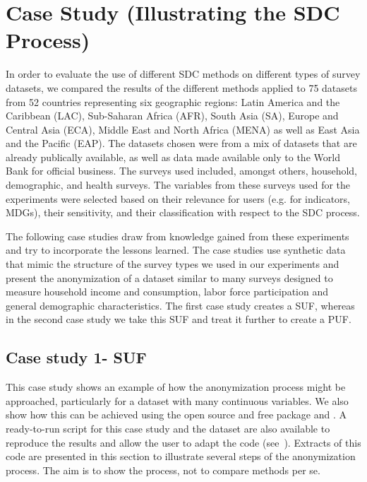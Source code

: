 \documentclass[letterpaper,10pt,english]{sphinxmanual}
\begin{document}
\chapter{Case Study (Illustrating the SDC Process)}
\label{\detokenize{case_studies:case-study-illustrating-the-sdc-process}}\label{\detokenize{case_studies::doc}}
In order to evaluate the use of different SDC methods on different types
of survey datasets, we compared the results of the different methods
applied to 75 datasets from 52 countries representing six geographic
regions: Latin America and the Caribbean (LAC), Sub-Saharan Africa
(AFR), South Asia (SA), Europe and Central Asia (ECA), Middle East and
North Africa (MENA) as well as East Asia and the Pacific (EAP). The
datasets chosen were from a mix of datasets that are already publically
available, as well as data made available only to the World Bank for
official business. The surveys used included, amongst others, household,
demographic, and health surveys. The variables from these surveys used
for the experiments were selected based on their relevance for users
(e.g. for indicators, MDGs), their sensitivity, and their classification
with respect to the SDC process.

The following case studies draw from knowledge gained from these
experiments and try to incorporate the lessons learned. The case studies
use synthetic data that mimic the structure of the survey types we used
in our experiments and present the anonymization of a dataset similar to
many surveys designed to measure household income and consumption, labor
force participation and general demographic characteristics. The first
case study creates a SUF, whereas in the second case study we take this
SUF and treat it further to create a PUF.


\section{Case study 1- SUF}
\label{\detokenize{case_studies:case-study-1-suf}}
This case study shows an example of how the anonymization process might
be approached, particularly for a dataset with many continuous
variables. We also show how this can be achieved using the open source
and free  package and . A ready-to-run  script for this
case study and the dataset are also available to reproduce the results
and allow the user to adapt the code
(see ). Extracts of this code
are presented in this section to illustrate several steps of the
anonymization process.  The aim is to show the
process, not to compare methods per se.
\end{document}
